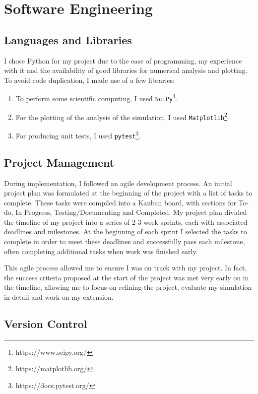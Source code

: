 \documentclass[12pt,a4paper,twoside,openright]{report}
\begin{document}
\section{Software Engineering}\label{section:software}

\subsection{Languages and Libraries}

I chose Python for my project due to the ease of programming, my experience with it and the availability of good libraries for numerical analysis and plotting. To avoid code duplication, I made use of a few libraries:

\begin{enumerate}
 	\item To perform some scientific computing, I used \verb|SciPy|\footnote{https://www.scipy.org/}.
	\item For the plotting of the analysis of the simulation, I used \verb|Matplotlib|\footnote{https://matplotlib.org/}. 
	\item For producing unit tests, I used \verb|pytest|\footnote{https://docs.pytest.org/}.
\end{enumerate}

\subsection{Project Management}

During implementation, I followed an agile development process. An initial project plan was formulated at the beginning of the project with a list of tasks to complete. These tasks were compiled into a Kanban board, with sections for To-do, In Progress, Testing/Documenting and Completed. My project plan divided the timeline of my project into a series of 2-3 week sprints, each with associated deadlines and milestones. At the beginning of each sprint I selected the tasks to complete in order to meet these deadlines and successfully pass each milestone, often completing additional tasks when work was finished early.

This agile process allowed me to ensure I was on track with my project. In fact, the success criteria proposed at the start of the project was met very early on in the timeline, allowing me to focus on refining the project, evaluate my simulation in detail and work on my extension. 

\subsection{Version Control}
\end{document}
